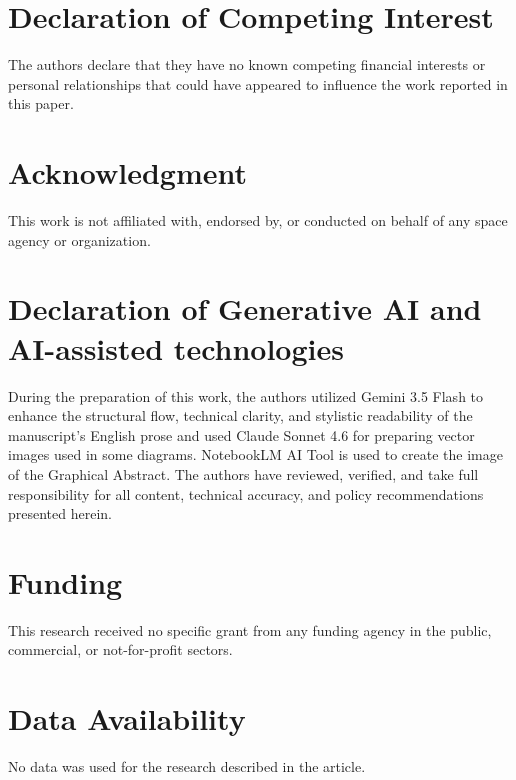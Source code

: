 \documentclass[final,5p,times,twocolumn]{elsarticle}
\begin{document}
\section*{Declaration of Competing Interest}
The authors declare that they have no known competing financial interests or personal relationships that could have appeared to influence the work reported in this paper.

\section*{Acknowledgment}
This work is not affiliated with, endorsed by, or conducted on behalf of any space agency or organization.

\section*{Declaration of Generative AI and AI-assisted technologies}
During the preparation of this work, the authors utilized Gemini 3.5 Flash to enhance the structural flow, technical clarity, and stylistic readability of the manuscript's English prose and used Claude Sonnet 4.6 for preparing vector images used in some diagrams. NotebookLM AI Tool is used to create the image of the Graphical Abstract. The authors have reviewed, verified, and take full responsibility for all content, technical accuracy, and policy recommendations presented herein.

\section*{Funding}
This research received no specific grant from any funding agency in the public, commercial, or not-for-profit sectors.

\section*{Data Availability}
No data was used for the research described in the article.



\end{document}
